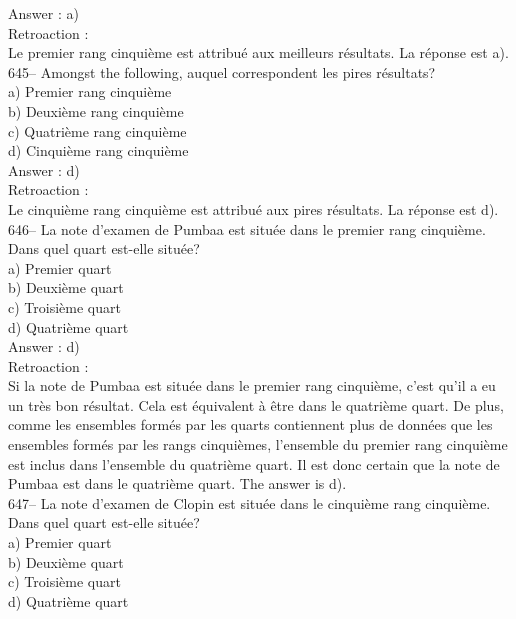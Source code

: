 ﻿\documentclass[letterpaper, 12pt]{article}
\begin{document}
Answer : a)\\

Retroaction : \\
Le premier rang cinqui\`eme est attribu\'e aux meilleurs r\'esultats.  La
r\'eponse est a).\\

645-- Amongst the following, auquel correspondent les pires
r\'esultats?\\
a) Premier rang cinqui\`eme\\
b) Deuxi\`eme rang cinqui\`eme\\
c) Quatri\`eme rang cinqui\`eme\\
d) Cinqui\`eme rang cinqui\`eme\\

Answer : d)\\

Retroaction : \\
Le cinqui\`eme rang cinqui\`eme est attribu\'e aux pires r\'esultats.  La
r\'eponse est d).\\

646-- La note d'examen de Pumbaa est situ\'ee dans le premier rang
cinqui\`eme.  Dans quel quart est-elle situ\'ee?\\
a) Premier quart\\
b) Deuxi\`eme quart\\
c) Troisi\`eme quart\\
d) Quatri\`eme quart\\

Answer : d)\\

Retroaction : \\
Si la note de Pumbaa est situ\'ee dans le premier rang cinqui\`eme, c'est
qu'il a eu un tr\`es bon r\'esultat.  Cela est \'equivalent \`a \^etre dans
le quatri\`eme quart.  De plus, comme les ensembles form\'es par les quarts
contiennent plus de donn\'ees que les ensembles form\'es par les rangs
cinqui\`emes, l'ensemble du premier rang cinqui\`eme est inclus dans
l'ensemble du quatri\`eme quart.  Il est donc certain que la note de Pumbaa
est dans le quatri\`eme quart.  The answer is d).\\

647-- La note d'examen de Clopin est situ\'ee dans le cinqui\`eme rang
cinqui\`eme.  Dans quel quart est-elle situ\'ee?\\
a) Premier quart\\
b) Deuxi\`eme quart\\
c) Troisi\`eme quart\\
d) Quatri\`eme quart\\
\end{document}
